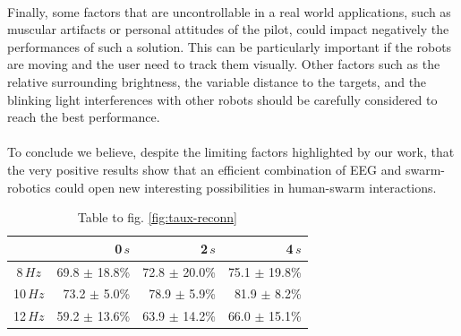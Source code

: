 \documentclass[smallextended]{svjour3}
\begin{document}
\\
Finally, some factors that are uncontrollable in a real world applications, such as muscular artifacts or personal attitudes of the pilot, could impact negatively the performances of such a solution. This can be particularly important if the robots are moving and the user need to track them visually. 
Other factors such as the relative surrounding brightness, the variable distance to the targets, and the blinking light interferences with other robots should be carefully considered to reach the best performance. \\
\\
To conclude we believe, despite the limiting factors highlighted by our work, that the very positive results show that an efficient combination of EEG and swarm-robotics could open new interesting possibilities in human-swarm interactions.\\

\begin{table}\begin{center}
    \begin{tabular}{ c | r | r | r }
        & 0\,$s$ & 2\,$s$ & 4\,$s$ \\ \hline

         8\,$Hz$ & 69.8 $\pm$ 18.8\% & 72.8 $\pm$ 20.0\% & 75.1 $\pm$ 19.8\% \\
        10\,$Hz$ & 73.2 $\pm$  5.0\% & 78.9 $\pm$  5.9\% & 81.9 $\pm$  8.2\% \\
        12\,$Hz$ & 59.2 $\pm$ 13.6\% & 63.9 $\pm$ 14.2\% & 66.0 $\pm$ 15.1\% \\
    \end{tabular}
    \caption{Table to fig. \ref{fig:taux-reconn}}
\end{center}\end{table}
\end{document}
